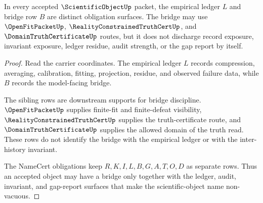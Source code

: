 \begin{theorem}
\label{thm:scientific-object-empirical-bridge-separation}
In every accepted $\ScientificObjectUp$ packet, the empirical ledger $L$ and bridge row $B$ are distinct obligation surfaces. The bridge may use $\OpenFitPacketUp$, $\RealityConstrainedTruthCertUp$, and $\DomainTruthCertificateUp$ routes, but it does not discharge record exposure, invariant exposure, ledger residue, audit strength, or the gap report by itself.
\end{theorem}
\begin{proof}
Read the carrier coordinates. The empirical ledger $L$ records compression, averaging, calibration, fitting, projection, residue, and observed failure data, while $B$ records the model-facing bridge.

The sibling rows are downstream supports for bridge discipline. $\OpenFitPacketUp$ supplies finite-fit and finite-defeat visibility, $\RealityConstrainedTruthCertUp$ supplies the truth-certificate route, and $\DomainTruthCertificateUp$ supplies the allowed domain of the truth read. These rows do not identify the bridge with the empirical ledger or with the inter-history invariant.

The NameCert obligations keep $R,K,I,L,B,G,A,T,O,D$ as separate rows. Thus an accepted object may have a bridge only together with the ledger, audit, invariant, and gap-report surfaces that make the scientific-object name non-vacuous.
\end{proof}

